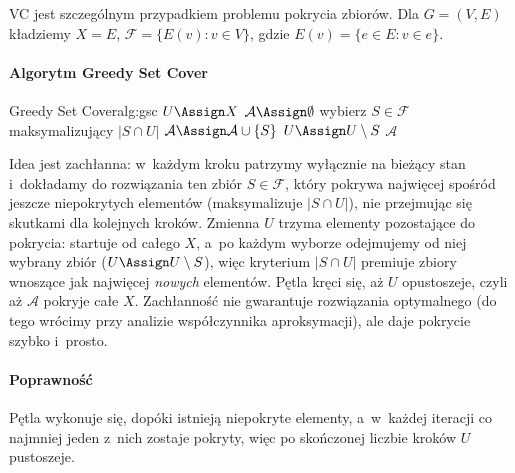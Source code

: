 \begin{remark}
	VC jest szczególnym przypadkiem problemu pokrycia zbiorów. Dla $G = (V, E)$ kładziemy $X = E$, $\mathcal{F} = \{E(v) : v \in V\}$, gdzie $E(v) = \{e \in E : v \in e\}$.
\end{remark}

\paragraph{Algorytm Greedy Set Cover}

\begin{alg}{Greedy Set Cover}{alg:gsc}
	\State $U \Assign X$ 
	\State $\mathcal{A} \Assign \emptyset$ 
	\State wybierz $S \in \mathcal{F}$ maksymalizujący $|S \cap U|$
	\State $\mathcal{A} \Assign \mathcal{A} \cup \{S\}$
	\State $U \Assign U \setminus S$
	\EndWhile
	\State \Return $\mathcal{A}$
	\EndFunction
\end{alg}

\begin{dygresja}
	Idea jest zachłanna: w~każdym kroku patrzymy wyłącznie na bieżący stan i~dokładamy do rozwiązania ten zbiór $S \in \mathcal{F}$, który pokrywa najwięcej spośród jeszcze niepokrytych elementów (maksymalizuje $|S \cap U|$), nie przejmując się skutkami dla kolejnych kroków. Zmienna $U$ trzyma elementy pozostające do pokrycia: startuje od całego $X$, a~po każdym wyborze odejmujemy od niej wybrany zbiór ($U \Assign U \setminus S$), więc kryterium $|S \cap U|$ premiuje zbiory wnoszące jak najwięcej \emph{nowych} elementów. Pętla kręci się, aż $U$ opustoszeje, czyli aż $\mathcal{A}$ pokryje całe $X$. Zachłanność nie gwarantuje rozwiązania optymalnego (do tego wrócimy przy analizie współczynnika aproksymacji), ale daje pokrycie szybko i~prosto.
\end{dygresja}

\paragraph{Poprawność}
Pętla wykonuje się, dopóki istnieją niepokryte elementy, a~w~każdej iteracji co najmniej jeden z~nich zostaje pokryty, więc po skończonej liczbie kroków $U$ pustoszeje.

